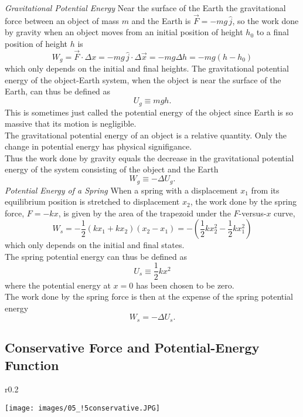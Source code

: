 \documentclass[11pt,a4paper]{report}
\begin{document}
\noindent
\textit{Gravitational Potential Energy} Near the surface of the Earth the gravitational force between an object of mass $m$ and the Earth is $\vec{F} = -mg\,\hat{j}$, so the work done by gravity when an object moves from an initial position of height $h_0$ to a final position of height $h$ is $$W_g = \vec{F} \cdot \Delta{x} = -mg\,\hat{j} \cdot \Delta{\vec{x}} = -mg \Delta{h} = -mg \left(h - h_0\right)$$ which only depends on the initial and final heights.
The gravitational potential energy of the object-Earth system, when the object is near the surface of the Earth, can thus be defined as $$U_g \equiv mgh.$$
This is sometimes just called the potential energy of the object since Earth is so massive that its motion is negligible.
\\The gravitational potential energy of an object is a relative quantity. Only the change in potential energy has physical signifigance.
\\Thus the work done by gravity equals the decrease in the gravitational potential energy of the system consisting of the object and the Earth $$W_g \equiv -\Delta{U_g}.$$
\textit{Potential Energy of a Spring} When a spring with a displacement $x_1$ from its equilibrium position is stretched to displacement $x_2$, the work done by the spring force, $F = -kx$, is given by the area of the trapezoid under the $F$-versus-$x$ curve, $$W_s = -\frac{1}{2} \left(kx_1 + kx_2\right)\left(x_2 - x_1\right) = -\left(\frac{1}{2} kx_2^2 - \frac{1}{2} kx_1^2\right)$$ which only depends on the initial and final states.
\\The spring potential energy can thus be defined as $$U_s \equiv \frac{1}{2} kx^2$$ where the potential energy at $x = 0$ has been chosen to be zero.
\\The work done by the spring force is then at the expense of the spring potential energy $$W_s = -\Delta{U_s}.$$

\subsection{Conservative Force and Potential-Energy Function}

\begin{wrapfigure}{r}{0.2\textwidth}
\vspace{-20pt}
\begin{center}
\texttt{[image: images/05\_!5conservative.JPG]}
\end{center}
\vspace{-20pt}
\end{wrapfigure}
\end{document}
